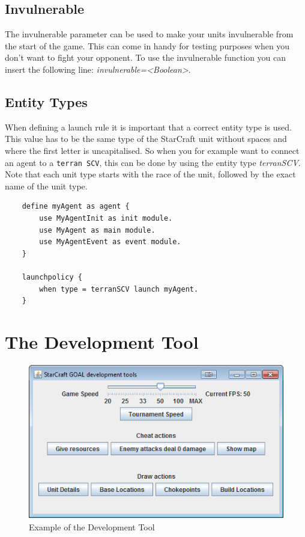 \subsection{Invulnerable}
\label{invulnerable}
The invulnerable parameter can be used to make your units invulnerable from the start of the game. This can come in handy for testing purposes when you don't want to fight your opponent. To use the invulnerable function you can insert the following line: \textit{invulnerable=<Boolean>}.

\subsection{Entity Types}
When defining a launch rule it is important that a correct entity type is used. This value has to be the same type of the StarCraft unit without spaces and where the first letter is uncapitalised. So when you for example want to connect an agent to a \texttt{terran SCV}, this can be done by using the entity type \textit{terranSCV}. Note that each unit type starts with the race of the unit, followed by the exact name of the unit type.

\begin{verbatim}
    define myAgent as agent {
        use MyAgentInit as init module.
        use MyAgent as main module.
        use MyAgentEvent as event module.
    }

    launchpolicy {
        when type = terranSCV launch myAgent.
    }
\end{verbatim}


\newpage
\section{The Development Tool}
\label{development tool}

\begin{figure}[h]
\includegraphics[width=1.0\textwidth]{images/developmentTool}
\caption{Example of the Development Tool}
\label{fig:StarCraft_picture}
\end{figure}

